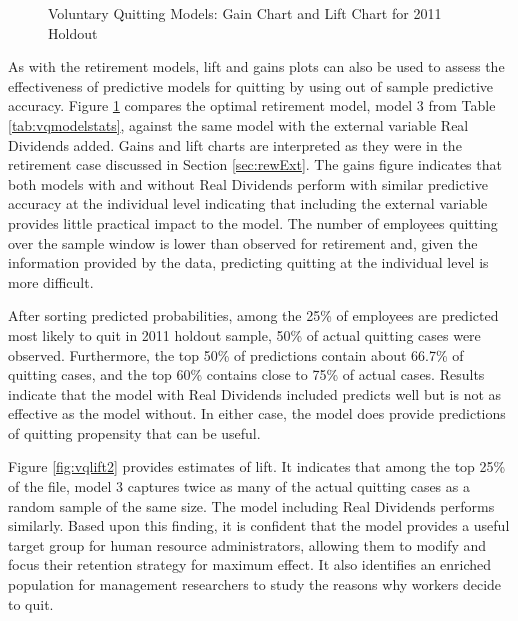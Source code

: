 \begin{figure}[h!]
	\centering
	\caption{Voluntary Quitting Models: Gain Chart and Lift Chart for 2011 Holdout}
	\label{fig:vqgainlift}
\end{figure}

As with the retirement models, lift and gains plots can also be used to assess the effectiveness of predictive models for quitting by using out of sample predictive accuracy.  Figure \ref{fig:vqgainlift} compares the optimal retirement model, model 3 from Table \ref{tab:vqmodelstats}, against the same model with the external variable Real Dividends added.  Gains and lift charts are interpreted as they were in the retirement case discussed in Section \ref{sec:rewExt}.  The gains figure indicates that both models with and without Real Dividends perform with similar predictive accuracy at the individual level indicating that including the external variable provides little practical impact to the model.  The number of employees quitting over the sample window is lower than observed for retirement and, given the information provided by the data, predicting quitting at the individual level is more difficult.

After sorting predicted probabilities, among the 25\% of employees are predicted most likely to quit in 2011 holdout sample, 50\% of actual quitting cases were observed. Furthermore, the top 50\% of predictions contain about 66.7\% of quitting cases, and the top 60\% contains close to 75\% of actual cases. Results indicate that the model with Real Dividends included predicts well but is not as effective as the model without.  In either case, the model does provide predictions of quitting propensity that can be useful.


Figure \ref{fig:vqlift2} provides estimates of lift.  It indicates that among the top 25\% of the file, model 3 captures twice as many of the actual quitting cases as a random sample of the same size.  The model including Real Dividends performs similarly.  Based upon this finding, it is confident that the model provides a useful target group for human resource administrators, allowing them to modify and focus their retention strategy for maximum effect. It also identifies an enriched population for management researchers to study the reasons why workers decide to quit.
